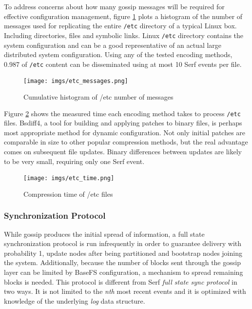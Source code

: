 \documentclass{sig-alternate}
\begin{document}
To address concerns about how many gossip messages will be required for effective configuration management, figure \ref{fig:etc-messages} plots a histogram of the number of messages used for replicating the entire \texttt{/etc} directory of a typical Linux box. Including directories, files and symbolic links. Linux \texttt{/etc} directory contains the system configuration and can be a good representative of an actual large distributed system configuration. Using any of the tested encoding methods, 0.987 of \texttt{/etc} content can be disseminated using at most 10 Serf events per file.

\begin{figure}
\centering
\texttt{[image: imgs/etc\_messages.png]}
\caption{Cumulative histogram of /etc number of messages}
\label{fig:etc-messages}
\end{figure}

Figure \ref{fig:etc-time} shows the measured time each encoding method takes to process \texttt{/etc} files. Bsdiff4, a tool for building and applying patches to binary files, is perhaps most appropriate method for dynamic configuration. Not only initial patches are comparable in size to other popular compression methods, but the real advantage comes on subsequent file updates. Binary differences between updates are likely to be very small, requiring only one Serf event.

\begin{figure}
\centering
\texttt{[image: imgs/etc\_time.png]}
\caption{Compression time of /etc files}
\label{fig:etc-time}
\end{figure}



\subsubsection{Synchronization Protocol}

While gossip produces the initial spread of information, a full state synchronization protocol is run infrequently in order to guarantee delivery with probability 1, update nodes after being partitioned and bootstrap nodes joining the system. Additionally, because the number of blocks sent through the gossip layer can be limited by BaseFS configuration, a mechanism to spread remaining blocks is needed. This protocol is different from Serf \textit{full state sync protocol} in two ways. It is not limited to the \textit{nth} most recent events and it is optimized with knowledge of the underlying \textit{log} data structure.
\end{document}
